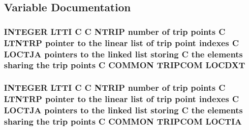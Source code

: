 \subsection{Variable Documentation}
\hypertarget{msa20_2home_2abonfi_2_c_f_d__codes_2_eul_f_s_83_82_83_2include_2trip_8com_a23376c308ff91ab97412c3efa31ea746}{
\subsubsection[{L\-O\-C\-D\-X\-T}]{\setlength{\rightskip}{0pt plus 5cm}I\-N\-T\-E\-G\-E\-R L\-T\-T\-I C C {\bf N\-T\-R\-I\-P} number of trip points C L\-T\-N\-T\-R\-P pointer to the linear list of trip point indexes C {\bf L\-O\-C\-T\-J\-A} pointers to the linked list storing C the elements sharing the trip points C C\-O\-M\-M\-O\-N T\-R\-I\-P\-C\-O\-M L\-O\-C\-D\-X\-T}}\label{msa20_2home_2abonfi_2_c_f_d__codes_2_eul_f_s_83_82_83_2include_2trip_8com_a23376c308ff91ab97412c3efa31ea746}
\hypertarget{msa20_2home_2abonfi_2_c_f_d__codes_2_eul_f_s_83_82_83_2include_2trip_8com_a9410695829be46f3379b92d229aab0aa}{
\subsubsection[{L\-O\-C\-T\-I\-A}]{\setlength{\rightskip}{0pt plus 5cm}I\-N\-T\-E\-G\-E\-R L\-T\-T\-I C C {\bf N\-T\-R\-I\-P} number of trip points C L\-T\-N\-T\-R\-P pointer to the linear list of trip point indexes C {\bf L\-O\-C\-T\-J\-A} pointers to the linked list storing C the elements sharing the trip points C C\-O\-M\-M\-O\-N T\-R\-I\-P\-C\-O\-M L\-O\-C\-T\-I\-A}}\label{msa20_2home_2abonfi_2_c_f_d__codes_2_eul_f_s_83_82_83_2include_2trip_8com_a9410695829be46f3379b92d229aab0aa}
